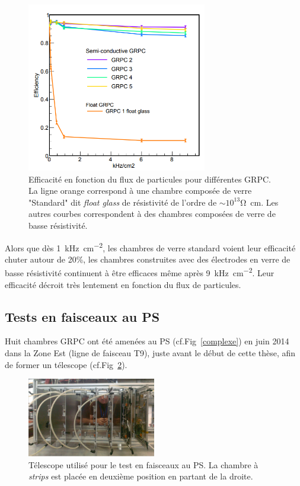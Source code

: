 \begin{figure}[ht!]
	\centering
	\includegraphics[width=0.7\textwidth]{GLA/effiDesy.png}
	\captionsetup{type=figure}\caption{Efficacité en fonction du flux de particules pour différentes GRPC. La ligne orange correspond à une chambre composée de verre "Standard" dit \textit{float glass} de résistivité de l'ordre de $\sim10^{13}$\si{\ohm.\cm}. Les autres courbes correspondent à des chambres composées de verre de basse résistivité.}
	\label{effiDesy}
\end{figure}

Alors que dès \SI{1}{\kilo\hertz\per\square\centi\meter}, les chambres de verre standard voient leur efficacité chuter autour de \num{20}\%, les chambres construites avec des électrodes en verre de basse résistivité continuent à être efficaces même après \SI{9}{\kilo\hertz\per\square\centi\meter}. Leur efficacité décroit très lentement en fonction du flux de particules.

\subsection{Tests en faisceaux au PS}
\label{PSS}
Huit chambres GRPC ont été amenées au PS (cf.Fig~\ref{complexe}) en juin \num{2014} dans la Zone Est (ligne de faisceau T9), juste avant le début de cette thèse, afin de former un télescope (cf.Fig~\ref{TelescopePS}).

\begin{figure}[ht!]
	\centering
	\includegraphics[width=0.50\textwidth]{GLA/TelescopePS.png}
	\captionsetup{type=figure}\caption{Télescope utilisé pour le test en faisceaux au PS. La chambre à \textit{strips} est placée en deuxième position en partant de la droite.}
	\label{TelescopePS}
\end{figure}

